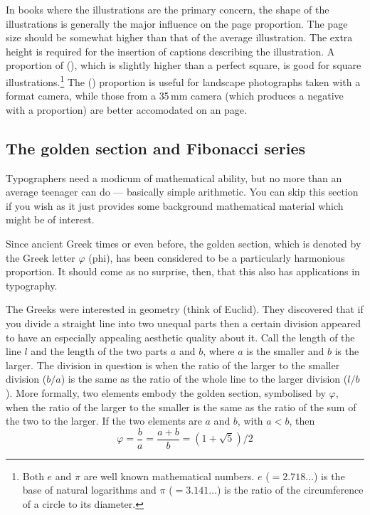 \documentclass[10pt,letterpaper,extrafontsizes]{memoir}
\newcommand\U[2]{\textrm{#1}\,\textrm{#2}}
\begin{document}
    In books where the illustrations are the primary 
concern, the shape of the illustrations is generally 
the major influence on the page proportion.
The page size should be somewhat higher than that of the average 
illustration. The extra height is required for the 
insertion of captions describing the
illustration. 
A proportion of  (), 
which is slightly higher
than a perfect square, is good for square illustrations.\footnote{Both $e$
and $\pi$ are well known mathematical numbers. $e$ ($= 2.718 \ldots$)
is the base of natural logarithms and $\pi$ ($= 3.141 \ldots$) is the
ratio of the circumference of a circle to its diameter.}
The 
() proportion is useful for landscape 
photographs  taken with a 
format camera, while those from a \U{35}{mm} camera (which produces a negative
with a  proportion) are better accomodated on 
an  page.

\subsection{The golden section and Fibonacci series}

    Typographers need a modicum of mathematical ability, but no more
than an average teenager can do --- basically simple arithmetic. You can
skip this section if you wish as it just provides some background 
mathematical material which might be of interest.

    Since ancient Greek times or even before, the golden section, which
is denoted by the Greek letter $\varphi$ (phi), has been considered to be
a particularly harmonious proportion. It should come as no surprise, then,
that this also has applications in typography.

    The Greeks were interested in geometry (think of Euclid). They discovered
that if you divide a straight line into two unequal parts then a certain
division appeared to have an especially appealing aesthetic quality about it. 
Call the length of the line $l$ and the length of the two parts $a$ and $b$, 
where $a$ is the smaller and $b$ is the larger. The division in question
is when the ratio of the larger to the smaller division ($b/a$) is the same
as the ratio of the whole line to the larger division ($l/b$).
More formally, two elements embody the golden section, symbolised by
$\varphi$, when the ratio of the larger
to the smaller is the same as the ratio of the sum of the two to the larger.
If the two elements are $a$ and $b$, with $a < b$, then
\begin{equation}
\varphi = \frac{b}{a} = \frac{a+b}{b} = (1+\sqrt{5})/2
\end{equation}
\end{document}
